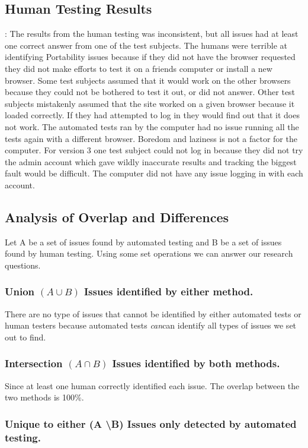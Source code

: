 \documentclass[journal,twocolumn]{IEEEtran}
\begin{document}
\subsection{Human Testing Results}:
The results from the human testing was inconsistent, but all issues had at least one correct answer from one of the test subjects. The humans were terrible at identifying Portability issues because if they did not have the browser requested they did not make efforts to test it on a friends computer or install a new browser. Some test subjects assumed that it would work on the other browsers because they could not be bothered to test it out, or did not answer. Other test subjects mistakenly assumed that the site worked on a given browser because it loaded correctly. If they had attempted to log in they would find out that it does not work. The automated tests ran by the computer had no issue running all the tests again with a different browser. Boredom and laziness is not a factor for the computer. For version 3 one test subject could not log in because they did not try the admin account which gave wildly inaccurate results and tracking the biggest fault would be difficult. The computer did not have any issue logging in with each account.

\subsection{Analysis of Overlap and Differences}
Let A be a set of issues found by automated testing and B be a set of issues found by human testing. Using some set operations we can answer our research questions.
\subsubsection{Union $(A \cup B)$ Issues identified by either method.}

There are no type of issues that cannot be identified by either automated tests or human testers because automated tests {\textit{can}}{can} identify all types of issues we set out to find.
\subsubsection{Intersection $(A \cap B)$ Issues identified by both methods.}

Since at least one human correctly identified each issue. The overlap between the two methods is 100\%.

\subsubsection{Unique to either (A \textbackslash B) Issues only detected by automated testing.}
\end{document}
